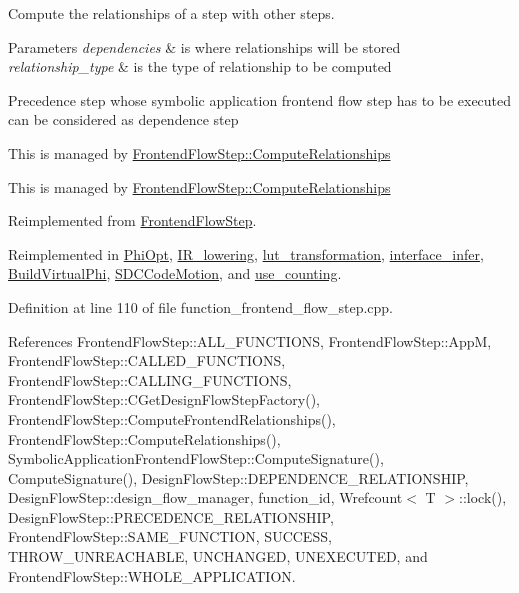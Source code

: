 Compute the relationships of a step with other steps. 


\begin{DoxyParams}{Parameters}
{\em dependencies} & is where relationships will be stored \\
\hline
{\em relationship\+\_\+type} & is the type of relationship to be computed \\
\hline
\end{DoxyParams}
Precedence step whose symbolic application frontend flow step has to be executed can be considered as dependence step

This is managed by \hyperlink{classFrontendFlowStep_a532ee0d76d7a10c373b4a7478a7eee18}{Frontend\+Flow\+Step\+::\+Compute\+Relationships}

This is managed by \hyperlink{classFrontendFlowStep_a532ee0d76d7a10c373b4a7478a7eee18}{Frontend\+Flow\+Step\+::\+Compute\+Relationships} 

Reimplemented from \hyperlink{classFrontendFlowStep_a532ee0d76d7a10c373b4a7478a7eee18}{Frontend\+Flow\+Step}.



Reimplemented in \hyperlink{classPhiOpt_ae9fa634dbb3dfb91ff7928cc8e48be1c}{Phi\+Opt}, \hyperlink{classIR__lowering_a47d1e16e6d42ddac272d166329013fd4}{I\+R\+\_\+lowering}, \hyperlink{classlut__transformation_a91631c01821c79e4c92f0be5d92af0a4}{lut\+\_\+transformation}, \hyperlink{classinterface__infer_adaf46bd679e004e36be194484e47e54e}{interface\+\_\+infer}, \hyperlink{classBuildVirtualPhi_a91ad5ae49dfe85e06f47e88df0dab90d}{Build\+Virtual\+Phi}, \hyperlink{classSDCCodeMotion_aba1edb7d7851104686225cf6aaa92c56}{S\+D\+C\+Code\+Motion}, and \hyperlink{classuse__counting_ae50eb0e5cc8c9e0a5c6a630ac6765f59}{use\+\_\+counting}.



Definition at line 110 of file function\+\_\+frontend\+\_\+flow\+\_\+step.\+cpp.



References Frontend\+Flow\+Step\+::\+A\+L\+L\+\_\+\+F\+U\+N\+C\+T\+I\+O\+NS, Frontend\+Flow\+Step\+::\+AppM, Frontend\+Flow\+Step\+::\+C\+A\+L\+L\+E\+D\+\_\+\+F\+U\+N\+C\+T\+I\+O\+NS, Frontend\+Flow\+Step\+::\+C\+A\+L\+L\+I\+N\+G\+\_\+\+F\+U\+N\+C\+T\+I\+O\+NS, Frontend\+Flow\+Step\+::\+C\+Get\+Design\+Flow\+Step\+Factory(), Frontend\+Flow\+Step\+::\+Compute\+Frontend\+Relationships(), Frontend\+Flow\+Step\+::\+Compute\+Relationships(), Symbolic\+Application\+Frontend\+Flow\+Step\+::\+Compute\+Signature(), Compute\+Signature(), Design\+Flow\+Step\+::\+D\+E\+P\+E\+N\+D\+E\+N\+C\+E\+\_\+\+R\+E\+L\+A\+T\+I\+O\+N\+S\+H\+IP, Design\+Flow\+Step\+::design\+\_\+flow\+\_\+manager, function\+\_\+id, Wrefcount$<$ T $>$\+::lock(), Design\+Flow\+Step\+::\+P\+R\+E\+C\+E\+D\+E\+N\+C\+E\+\_\+\+R\+E\+L\+A\+T\+I\+O\+N\+S\+H\+IP, Frontend\+Flow\+Step\+::\+S\+A\+M\+E\+\_\+\+F\+U\+N\+C\+T\+I\+ON, S\+U\+C\+C\+E\+SS, T\+H\+R\+O\+W\+\_\+\+U\+N\+R\+E\+A\+C\+H\+A\+B\+LE, U\+N\+C\+H\+A\+N\+G\+ED, U\+N\+E\+X\+E\+C\+U\+T\+ED, and Frontend\+Flow\+Step\+::\+W\+H\+O\+L\+E\+\_\+\+A\+P\+P\+L\+I\+C\+A\+T\+I\+ON.



